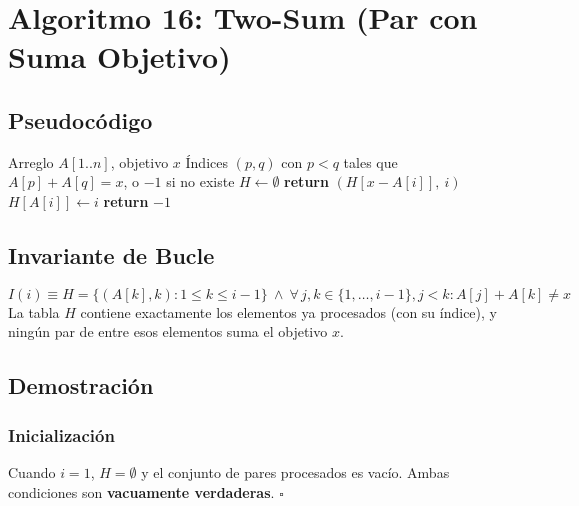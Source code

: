 \documentclass[11pt,a4paper]{article}
\newcommand{\inv}{I}
\begin{document}
\newpage

\section{Algoritmo 16: Two-Sum (Par con Suma Objetivo)}

\subsection{Pseudocódigo}
\begin{algorithm}[H]
\caption{Two-Sum (con tabla hash)}
\begin{algorithmic}[1]
\Require Arreglo $A[1..n]$, objetivo $x$
\Ensure Índices $(p, q)$ con $p < q$ tales que $A[p] + A[q] = x$, o $-1$ si no existe
\State $H \gets \emptyset$ 
        \State \textbf{return} $(H[x - A[i]],\ i)$
    \EndIf
    \State $H[A[i]] \gets i$
\EndFor
\State \textbf{return} $-1$
\end{algorithmic}
\end{algorithm}

\subsection{Invariante de Bucle}
\[
\boxed{\inv(i) \equiv H = \{(A[k], k) : 1 \leq k \leq i-1\} \ \wedge \ \forall\, j,k \in \{1, \ldots, i-1\}, j < k: A[j] + A[k] \neq x}
\]
La tabla $H$ contiene exactamente los elementos ya procesados (con su índice), y ningún par de entre esos elementos suma el objetivo $x$.

\subsection{Demostración}

\subsubsection{Inicialización}
Cuando $i = 1$, $H = \emptyset$ y el conjunto de pares procesados es vacío. Ambas condiciones son \textbf{vacuamente verdaderas}. $\square$
\end{document}
